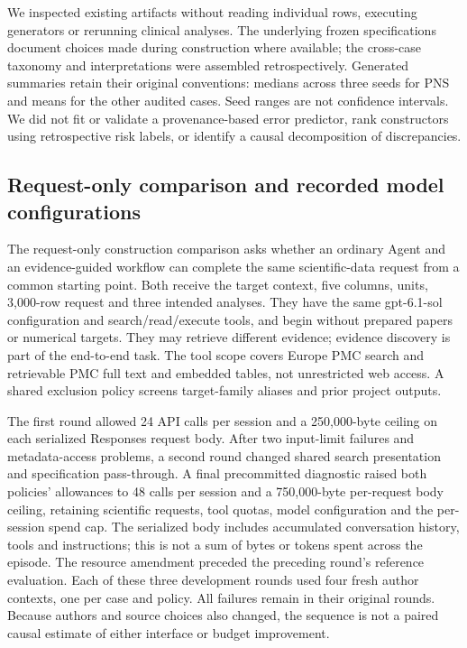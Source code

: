 \documentclass[11pt,letterpaper]{article}
\begin{document}
We inspected existing artifacts without reading individual rows, executing generators or rerunning clinical analyses. The underlying frozen specifications document choices made during construction where available; the cross-case taxonomy and interpretations were assembled retrospectively. Generated summaries retain their original conventions: medians across three seeds for PNS and means for the other audited cases. Seed ranges are not confidence intervals. We did not fit or validate a provenance-based error predictor, rank constructors using retrospective risk labels, or identify a causal decomposition of discrepancies.


\subsection{Request-only comparison and recorded model configurations}

The request-only construction comparison asks whether an ordinary Agent and an evidence-guided workflow can complete the same scientific-data request from a common starting point. Both receive the target context, five columns, units, 3,000-row request and three intended analyses. They have the same gpt-6.1-sol configuration and search/\allowbreak{}read/\allowbreak{}execute tools, and begin without prepared papers or numerical targets. They may retrieve different evidence; evidence discovery is part of the end-to-end task. The tool scope covers Europe PMC search and retrievable PMC full text and embedded tables, not unrestricted web access. A shared exclusion policy screens target-family aliases and prior project outputs.


The first round allowed 24 API calls per session and a 250,000-byte ceiling on each serialized Responses request body. After two input-limit failures and metadata-access problems, a second round changed shared search presentation and specification pass-through. A final precommitted diagnostic raised both policies' allowances to 48 calls per session and a 750,000-byte per-request body ceiling, retaining scientific requests, tool quotas, model configuration and the per-session spend cap. The serialized body includes accumulated conversation history, tools and instructions; this is not a sum of bytes or tokens spent across the episode. The resource amendment preceded the preceding round's reference evaluation. Each of these three development rounds used four fresh author contexts, one per case and policy. All failures remain in their original rounds. Because authors and source choices also changed, the sequence is not a paired causal estimate of either interface or budget improvement.
\end{document}
